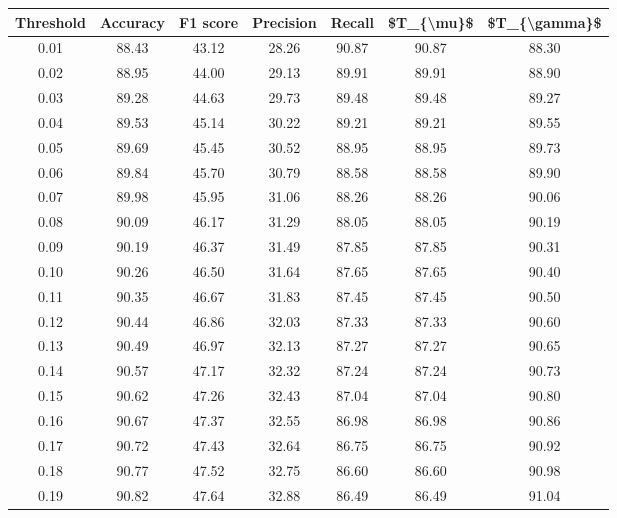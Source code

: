 \begin{tabular}{|c|c|c|c|c|c|c|}
\hline
 Threshold &  Accuracy &  F1 score &  Precision &  Recall &  \$T\_\{\textbackslash mu\}\$ &  \$T\_\{\textbackslash gamma\}\$ \\
\hline
      0.01 &     88.43 &     43.12 &      28.26 &   90.87 &      90.87 &         88.30 \\
      0.02 &     88.95 &     44.00 &      29.13 &   89.91 &      89.91 &         88.90 \\
      0.03 &     89.28 &     44.63 &      29.73 &   89.48 &      89.48 &         89.27 \\
      0.04 &     89.53 &     45.14 &      30.22 &   89.21 &      89.21 &         89.55 \\
      0.05 &     89.69 &     45.45 &      30.52 &   88.95 &      88.95 &         89.73 \\
      0.06 &     89.84 &     45.70 &      30.79 &   88.58 &      88.58 &         89.90 \\
      0.07 &     89.98 &     45.95 &      31.06 &   88.26 &      88.26 &         90.06 \\
      0.08 &     90.09 &     46.17 &      31.29 &   88.05 &      88.05 &         90.19 \\
      0.09 &     90.19 &     46.37 &      31.49 &   87.85 &      87.85 &         90.31 \\
      0.10 &     90.26 &     46.50 &      31.64 &   87.65 &      87.65 &         90.40 \\
      0.11 &     90.35 &     46.67 &      31.83 &   87.45 &      87.45 &         90.50 \\
      0.12 &     90.44 &     46.86 &      32.03 &   87.33 &      87.33 &         90.60 \\
      0.13 &     90.49 &     46.97 &      32.13 &   87.27 &      87.27 &         90.65 \\
      0.14 &     90.57 &     47.17 &      32.32 &   87.24 &      87.24 &         90.73 \\
      0.15 &     90.62 &     47.26 &      32.43 &   87.04 &      87.04 &         90.80 \\
      0.16 &     90.67 &     47.37 &      32.55 &   86.98 &      86.98 &         90.86 \\
      0.17 &     90.72 &     47.43 &      32.64 &   86.75 &      86.75 &         90.92 \\
      0.18 &     90.77 &     47.52 &      32.75 &   86.60 &      86.60 &         90.98 \\
      0.19 &     90.82 &     47.64 &      32.88 &   86.49 &      86.49 &         91.04 \\

\end{tabular}
